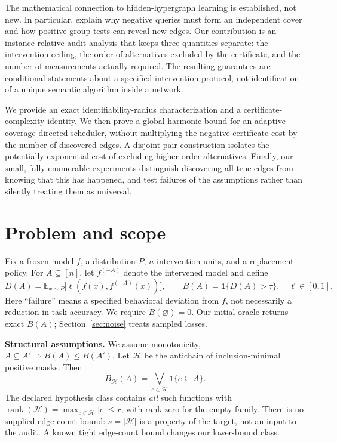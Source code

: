 \documentclass[10pt]{article}
\theoremstyle{definition}\newtheorem{definition}[theorem]{Definition}
\newcommand{\HH}{\mathcal H}
\newcommand{\ind}{\mathbf 1}
\newcommand{\rank}{\operatorname{rank}}
\newcommand{\E}{\mathbb E}
\begin{document}
The mathematical connection to hidden-hypergraph learning is established, not new.
In particular, \citet{angluin2006} explain why negative queries must form an independent
cover and how positive group tests can reveal new edges. Our contribution is an
instance-relative audit analysis that keeps three quantities separate: the intervention
ceiling, the order of alternatives excluded by the certificate, and the number of
measurements actually required. The resulting guarantees are conditional statements
about a specified intervention protocol, not identification of a unique semantic
algorithm inside a network.

We provide an exact identifiability-radius characterization and a certificate-complexity
identity. We then prove a global harmonic bound for an adaptive coverage-directed
scheduler, without multiplying the negative-certificate cost by the number of
discovered edges. A disjoint-pair construction isolates the potentially exponential
cost of excluding higher-order alternatives. Finally, our small, fully enumerable
experiments distinguish discovering all true edges from knowing that this has happened,
and test failures of the assumptions rather than silently treating them as universal.

\section{Problem and scope}
Fix a frozen model $f$, a distribution $P$, $n$ intervention units, and a replacement
policy. For $A\subseteq[n]$, let $f^{(-A)}$ denote the intervened model and define
\begin{equation}
 D(A)=\E_{x\sim P}\big[\ell(f(x),f^{(-A)}(x))\big],\qquad
 B(A)=\ind\{D(A)>\tau\},\quad \ell\in[0,1].
 \label{eq:behavior}
\end{equation}
Here ``failure'' means a specified behavioral deviation from $f$, not necessarily a
reduction in task accuracy. We require $B(\varnothing)=0$. Our initial oracle returns
exact $B(A)$; Section~\ref{sec:noise} treats sampled losses.

\textbf{Structural assumptions.} We assume monotonicity,
$A\subseteq A'\Rightarrow B(A)\le B(A')$. Let $\HH$ be the antichain of inclusion-minimal
positive masks. Then
\begin{equation}
 B_{\HH}(A)=\bigvee_{e\in\HH}\ind\{e\subseteq A\}.
 \label{eq:hypergraph}
\end{equation}
The declared hypothesis class contains \emph{all} such functions with
$\rank(\HH)=\max_{e\in\HH}|e|\le r$, with rank zero for the empty family. There is no
supplied edge-count bound: $s=|\HH|$ is a property of the target, not an input to the
audit. A known tight edge-count bound changes our lower-bound class.
\end{document}
